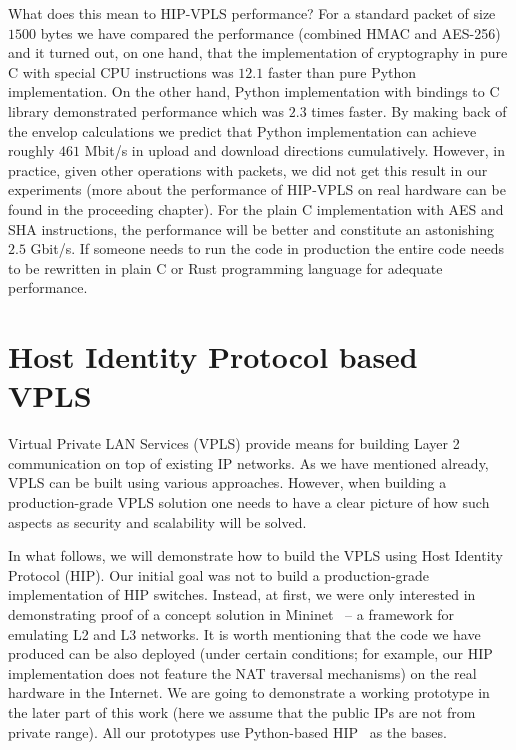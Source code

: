 What does this mean to HIP-VPLS performance? For a standard packet of size $1500$ 
bytes we have compared the performance (combined HMAC and AES-256) and it turned 
out, on one hand, that the implementation of cryptography in pure C with special CPU instructions was 
$12.1$ faster than pure Python implementation. On the other hand, Python implementation with bindings
to C library demonstrated performance which was $2.3$ times faster. By making back of the envelop calculations
we predict that Python implementation can achieve roughly $461$ Mbit/s in upload and download directions
cumulatively. However, in practice, given other operations with packets, we did not get this result 
in our experiments (more about the performance of HIP-VPLS on real hardware can be found in the proceeding 
chapter). For the plain C implementation with AES and SHA instructions, the performance will be 
better and constitute an astonishing $2.5$ Gbit/s. If someone needs to run the code in production
the entire code needs to be rewritten in plain C or Rust programming language for adequate performance.

\section{Host Identity Protocol based VPLS}

Virtual Private LAN Services (VPLS) provide means for building Layer 2 communication 
on top of existing IP networks. As we have mentioned already, VPLS can be built using various approaches. However, 
when building a production-grade VPLS solution one needs to have a clear picture of 
how such aspects as security and scalability will be solved.

In what follows, we will demonstrate how to build the VPLS using Host Identity Protocol (HIP). 
Our initial goal was not to build a production-grade implementation of HIP switches. Instead, 
at first, we were only interested in demonstrating proof of a concept solution in 
Mininet~\cite{mininet} – a framework for emulating L2 and L3 networks. It is worth mentioning that the code 
we have produced can be also deployed (under certain conditions; for example, our HIP implementation 
does not feature the NAT traversal mechanisms) on the real hardware in the Internet. We are going to demonstrate 
a working prototype in the later part of this work (here we assume that the public IPs are not from private 
range). All our prototypes use Python-based HIP~\cite{pyhip} as the bases.

